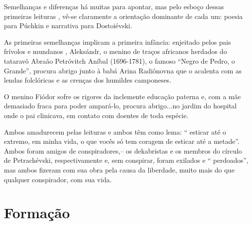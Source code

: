Semelhanças e diferenças há muitas para apontar, mas pelo esboço dessas
primeiras leituras , vê-se claramente a orientação dominante de cada um:
poesia para Púchkin e narrativa para Dostoiévski.

As primeiras semelhanças implicam a primeira infância: enjeitado pelos
pais frívolos e mundanos , Aleksándr, o menino de traços africanos
herdados do tataravô Abraão Petróvitch Aníbal (1696-1781), o famoso
``Negro de Pedro, o Grande'', procura abrigo junto à babá Arina
Radiônovna que o acalenta com as lendas folclóricas e as crenças dos
humildes camponeses.

O menino Fiódor sofre os rigores da inclemente educação paterna e, com a
mãe demasiado fraca para poder ampará-lo, procura abrigo...no jardim do
hospital onde o pai clinicava, em contato com doentes de toda espécie.

Ambos amadurecem pelas leituras e ambos têm como lema: `` esticar até o
extremo, em minha vida, o que vocês só tem coragem de esticar até a
metade''. Ambos foram amigos de conspiradores,-- os dekabristas e os
membros do círculo de Petrachévski, respectivamente e, sem conspirar,
foram exilados e `` perdoados'', mas ambos fizeram com sua obra pela
causa da liberdade, muito mais do que qualquer conspirador, com sua
vida.

\section{Formação}

